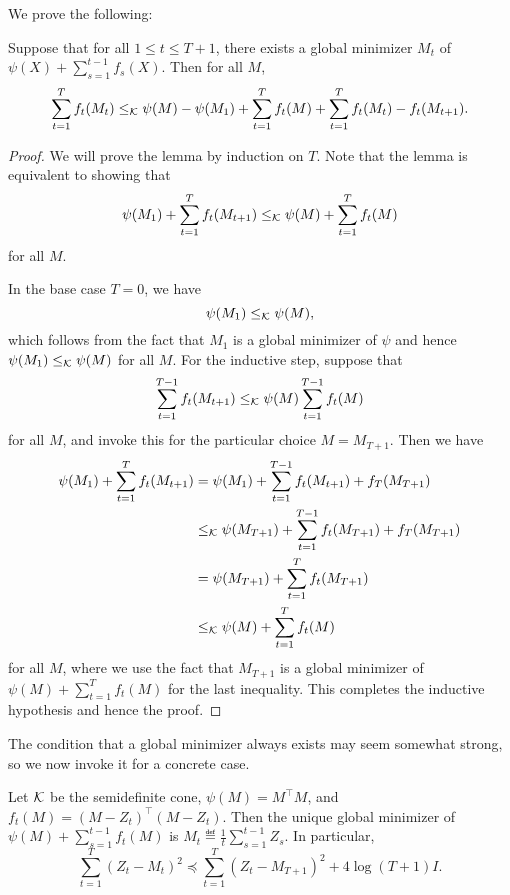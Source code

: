 \documentclass[11pt]{article}
\begin{document}
We prove the following:
\begin{lemma}
\label{lem:ftrl-k}
Suppose that for all $1 \leq t \leq T+1$, there 
exists a global minimizer $M_t$ of 
$\psi(X) + \sum_{s=1}^{t-1} f_s(X)$. Then for all $M$,
\[ \sum_{t=1}^T f_t(M_t) \leq_{\mathcal{K}} \psi(M) - \psi(M_1) + \sum_{t=1}^T f_t(M) + \sum_{t=1}^T f_t(M_{t}) - f_t(M_{t+1}). \]
\end{lemma}
\begin{proof}
We will prove the lemma by induction on $T$. Note that the lemma is equivalent to showing that 
\[ \psi(M_1) + \sum_{t=1}^T f_t(M_{t+1}) \leq_{\mathcal{K}} \psi(M) + \sum_{t=1}^T f_t(M) \]
for all $M$.

In the base case $T = 0$, we have
\[ \psi(M_1) \leq_{\mathcal{K}} \psi(M), \]
which follows from the fact that $M_1$ is a global minimizer of $\psi$ and 
hence $\psi(M_1) \leq_{\mathcal{K}} \psi(M)$ for all $M$. For the inductive step, suppose that
\[ \sum_{t=1}^{T-1} f_t(M_{t+1}) \leq_{\mathcal{K}} \psi(M) \sum_{t=1}^{T-1} f_t(M) \]
for all $M$, and invoke this for the particular choice $M = M_{T+1}$. Then we have
\begin{align}
\psi(M_1) + \sum_{t=1}^T f_t(M_{t+1}) &= \psi(M_1) + \sum_{t=1}^{T-1} f_t(M_{t+1}) + f_T(M_{T+1}) \\
 &\leq_{\mathcal{K}} \psi(M_{T+1}) + \sum_{t=1}^{T-1} f_t(M_{T+1}) + f_T(M_{T+1}) \\
 &= \psi(M_{T+1}) + \sum_{t=1}^T f_t(M_{T+1}) \\
 &\leq_{\mathcal{K}} \psi(M) + \sum_{t=1}^T f_t(M)
\end{align}
for all $M$, where we use the fact that $M_{T+1}$ is a global minimizer of $\psi(M) + \sum_{t=1}^T f_t(M)$ for 
the last inequality. This completes the inductive hypothesis and hence the proof.
\end{proof}

The condition that a global minimizer always exists may seem somewhat strong, so we now invoke it for a concrete case.
\begin{corollary}
\label{cor:ftrl-matrix}
Let $\mathcal{K}$ be the semidefinite cone, $\psi(M) = M^{\top}M$, and $f_t(M) = (M - Z_t)^{\top}(M - Z_t)$. 
Then the unique global minimizer of $\psi(M) + \sum_{s=1}^{t-1} f_t(M)$ is $M_t \eqdef \frac{1}{t} \sum_{s=1}^{t-1} Z_s$. 
In particular, 
\[ \sum_{t=1}^T (Z_t - M_t)^2 \preceq \sum_{t=1}^T (Z_t - M_{T+1})^2 + 4\log(T+1)I. \]
\end{corollary}
\end{document}
